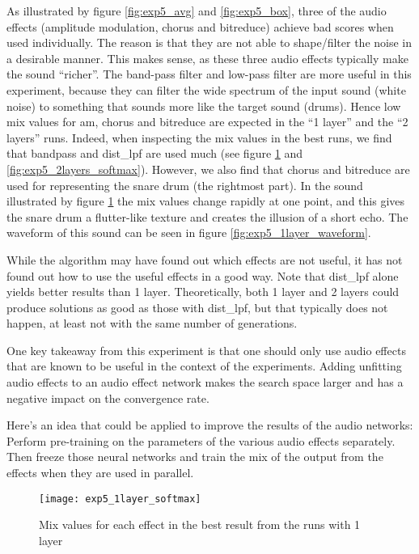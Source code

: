 As illustrated by figure \ref{fig:exp5_avg} and \ref{fig:exp5_box}, three of the audio effects (amplitude modulation, chorus and bitreduce) achieve bad scores when used individually. The reason is that they are not able to shape/filter the noise in a desirable manner. This makes sense, as these three audio effects typically make the sound ``richer''. The band-pass filter and low-pass filter are more useful in this experiment, because they can filter the wide spectrum of the input sound (white noise) to something that sounds more like the target sound (drums). Hence low mix values for am, chorus and bitreduce are expected in the ``1 layer'' and the ``2 layers'' runs. Indeed, when inspecting the mix values in the best runs, we find that bandpass and dist\_lpf are used much (see figure \ref{fig:exp5_1layer_softmax} and \ref{fig:exp5_2layers_softmax}). However, we also find that chorus and bitreduce are used for representing the snare drum (the rightmost part). In the sound illustrated by figure \ref{fig:exp5_1layer_softmax} the mix values change rapidly at one point, and this gives the snare drum a flutter-like texture and creates the illusion of a short echo. The waveform of this sound can be seen in figure \ref{fig:exp5_1layer_waveform}.

While the algorithm may have found out which effects are not useful, it has not found out how to use the useful effects in a good way. Note that dist\_lpf alone yields better results than 1 layer. Theoretically, both 1 layer and 2 layers could produce solutions as good as those with dist\_lpf, but that typically does not happen, at least not with the same number of generations.

One key takeaway from this experiment is that one should only use audio effects that are known to be useful in the context of the experiments. Adding unfitting audio effects to an audio effect network makes the search space larger and has a negative impact on the convergence rate.

Here's an idea that could be applied to improve the results of the audio networks: Perform pre-training on the parameters of the various audio effects separately. Then freeze those neural networks and train the mix of the output from the effects when they are used in parallel.



\begin{figure}[h]
    \centering
    \texttt{[image: exp5\_1layer\_softmax]}
    \caption{Mix values for each effect in the best result from the runs with 1 layer}
    \label{fig:exp5_1layer_softmax}
\end{figure}

